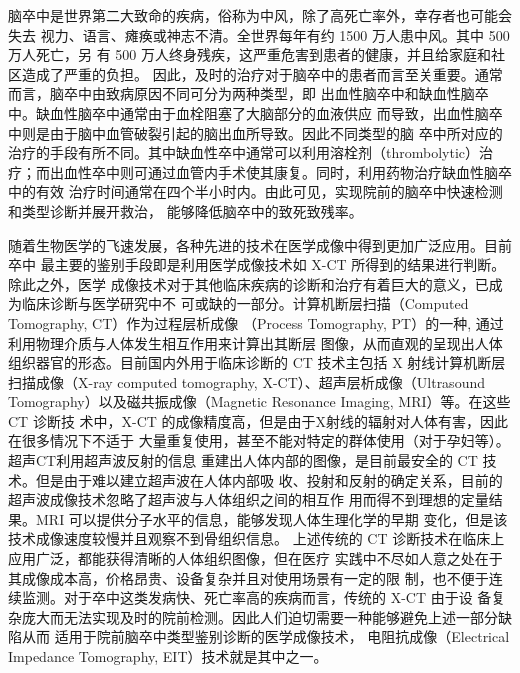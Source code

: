 


脑卒中是世界第二大致命的疾病，俗称为中风，除了高死亡率外，幸存者也可能会失去
视力、语言、瘫痪或神志不清。全世界每年有约 1500 万人患中风。其中 500 万人死亡，另
有 500 万人终身残疾，这严重危害到患者的健康，并且给家庭和社区造成了严重的负担。
因此，及时的治疗对于脑卒中的患者而言至关重要。通常而言，脑卒中由致病原因不同可分为两种类型，即
出血性脑卒中和缺血性脑卒中。缺血性脑卒中通常由于血栓阻塞了大脑部分的血液供应
而导致，出血性脑卒中则是由于脑中血管破裂引起的脑出血所导致。因此不同类型的脑
卒中所对应的治疗的手段有所不同。其中缺血性卒中通常可以利用溶栓剂（thrombolytic）治
疗；而出血性卒中则可通过血管内手术使其康复。同时，利用药物治疗缺血性脑卒中的有效
治疗时间通常在四个半小时内。由此可见，实现院前的脑卒中快速检测和类型诊断并展开救治，
能够降低脑卒中的致死致残率。

随着生物医学的飞速发展，各种先进的技术在医学成像中得到更加广泛应用。目前卒中
最主要的鉴别手段即是利用医学成像技术如 X-CT 所得到的结果进行判断。除此之外，医学
成像技术对于其他临床疾病的诊断和治疗有着巨大的意义，已成为临床诊断与医学研究中不
可或缺的一部分。计算机断层扫描（Computed Tomography, CT）作为过程层析成像
（Process Tomography, PT）的一种, 通过利用物理介质与人体发生相互作用来计算出其断层
图像，从而直观的呈现出人体组织器官的形态。目前国内外用于临床诊断的 CT 技术主包括
X 射线计算机断层扫描成像（X-ray computed tomography, X-CT）、超声层析成像（Ultrasound
Tomography）以及磁共振成像（Magnetic Resonance Imaging, MRI）等。在这些 CT 诊断技
术中，X-CT 的成像精度高，但是由于X射线的辐射对人体有害，因此在很多情况下不适于
大量重复使用，甚至不能对特定的群体使用（对于孕妇等）。超声CT利用超声波反射的信息
重建出人体内部的图像，是目前最安全的 CT 技术。但是由于难以建立超声波在人体内部吸
收、投射和反射的确定关系，目前的超声波成像技术忽略了超声波与人体组织之间的相互作
用而得不到理想的定量结果。MRI 可以提供分子水平的信息，能够发现人体生理化学的早期
变化，但是该技术成像速度较慢并且观察不到骨组织信息。
上述传统的 CT 诊断技术在临床上应用广泛，都能获得清晰的人体组织图像，但在医疗
实践中不尽如人意之处在于其成像成本高，价格昂贵、设备复杂并且对使用场景有一定的限
制，也不便于连续监测。对于卒中这类发病快、死亡率高的疾病而言，传统的 X-CT 由于设
备复杂庞大而无法实现及时的院前检测。因此人们迫切需要一种能够避免上述一部分缺陷从而
适用于院前脑卒中类型鉴别诊断的医学成像技术，
电阻抗成像（Electrical Impedance Tomography, EIT）技术就是其中之一。

